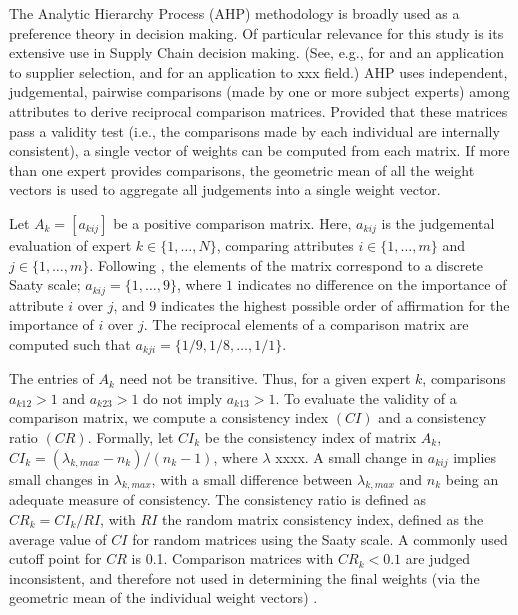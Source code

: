 \documentclass[a4paper]{article}
\begin{document}
The Analytic Hierarchy Process (AHP) methodology is broadly used as a preference theory in decision making.
Of particular relevance for this study is its extensive use in Supply Chain decision making.
(See, e.g., \citet{Ishizaka:2011} for and an application to supplier selection, and \citet{Momani:2011} for an application to xxx field.)
AHP uses independent, judgemental, pairwise comparisons (made by one or more subject experts) among attributes to derive reciprocal comparison matrices.
Provided that these matrices pass a validity test (i.e., the comparisons made by each individual are internally consistent), a single vector of weights can be computed from each matrix.
If more than one expert provides comparisons, the geometric mean of all the weight vectors is used to aggregate all judgements into a single weight vector.

Let $A_k=[a_{kij}]$ be a positive comparison matrix.
Here, $a_{kij}$ is the judgemental evaluation of expert $k \in \lbrace 1, \dots, N \rbrace$, comparing attributes $i  \in \lbrace 1, \dots, m \rbrace $ and $j  \in \lbrace 1, \dots, m \rbrace$.
Following \citet{Saaty:1987}, the elements of the matrix correspond to a discrete Saaty scale; $a_{kij}=\lbrace 1,\dots,9\rbrace$, where $1$ indicates no difference on the importance of attribute $i$ over $j$, and $9$ indicates the highest possible order of affirmation for the importance of $i$ over $j$.
The reciprocal elements of a comparison matrix are computed such that $a_{kji}=\lbrace 1/9, 1/8,  \dots, 1/1 \rbrace$.

The entries of $A_k$ need not be transitive.
Thus, for a given expert $k$, comparisons $a_{k12}>1$ and $a_{k23}>1$ do not imply $a_{k13}>1$.
To evaluate the validity of a comparison matrix, we compute a consistency index $(CI)$ and a consistency ratio $(CR)$.
Formally, let $CI_k$ be the consistency index of matrix $A_k$, $CI_k=(\lambda_{k,max}-n_k)/(n_k-1)$, where $\lambda$ xxxx. 
A small change in $a_{kij}$ implies small changes in $\lambda_{k,max}$, with a small difference between $\lambda_{k,max}$ and $n_k$ being an adequate measure of consistency. 
The consistency ratio is defined as $CR_k=CI_k/RI$, with $RI$ the random matrix consistency index, defined as the average value of $CI$ for random matrices using the Saaty scale. 
A commonly used cutoff point for $CR$ is 0.1.
Comparison matrices with $CR_k<0.1$ are judged inconsistent, and therefore not used in determining the final weights (via the geometric mean of the individual weight vectors) \citep{Ishizaka:2011, Saaty:1987}.
\end{document}
